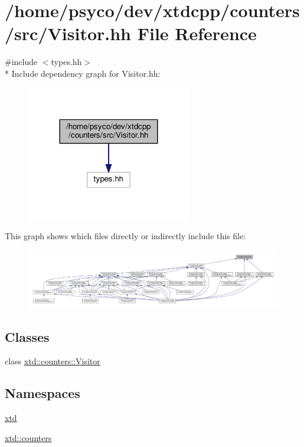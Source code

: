\hypertarget{Visitor_8hh}{}\section{/home/psyco/dev/xtdcpp/counters/src/\+Visitor.hh File Reference}
\label{Visitor_8hh}
{\ttfamily \#include $<$types.\+hh$>$}\\*
Include dependency graph for Visitor.\+hh\+:
\nopagebreak
\begin{figure}[H]
\begin{center}
\leavevmode
\includegraphics[width=204pt]{Visitor_8hh__incl}
\end{center}
\end{figure}
This graph shows which files directly or indirectly include this file\+:
\nopagebreak
\begin{figure}[H]
\begin{center}
\leavevmode
\includegraphics[width=350pt]{Visitor_8hh__dep__incl}
\end{center}
\end{figure}
\subsection*{Classes}
\begin{DoxyCompactItemize}
\item 
class \hyperlink{classxtd_1_1counters_1_1Visitor}{xtd\+::counters\+::\+Visitor}
\end{DoxyCompactItemize}
\subsection*{Namespaces}
\begin{DoxyCompactItemize}
\item 
 \hyperlink{namespacextd}{xtd}
\item 
 \hyperlink{namespacextd_1_1counters}{xtd\+::counters}
\end{DoxyCompactItemize}
